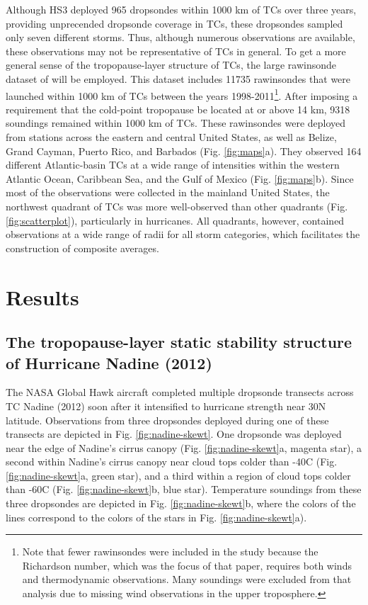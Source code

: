Although HS3 deployed 965 dropsondes within 1000 km of TCs over three years, providing unprecended dropsonde coverage in TCs, these dropsondes sampled only seven different storms.
Thus, although numerous observations are available, these observations may not be representative of TCs in general.
To get a more general sense of the tropopause-layer structure of TCs, the large rawinsonde dataset of \cite{DuranMolinari2016} will be employed.
This dataset includes 11735 rawinsondes that were launched within 1000 km of TCs between the years 1998-2011\footnote{Note that fewer rawinsondes were included in the \cite{DuranMolinari2016} study because the Richardson number, which was the focus of that paper, requires both winds and thermodynamic observations. Many soundings were excluded from that analysis due to missing wind observations in the upper troposphere.}.
After imposing a requirement that the cold-point tropopause be located at or above 14 km, 9318 soundings remained within 1000 km of TCs.
These rawinsondes were deployed from stations across the eastern and central United States, as well as Belize, Grand Cayman, Puerto Rico, and Barbados (Fig. \ref{fig:maps}a).
They observed 164 different Atlantic-basin TCs at a wide range of intensities within the western Atlantic Ocean, Caribbean Sea, and the Gulf of Mexico (Fig. \ref{fig:maps}b).
Since most of the observations were collected in the mainland United States, the northwest quadrant of TCs was more well-observed than other quadrants (Fig. \ref{fig:scatterplot}), particularly in hurricanes.
All quadrants, however, contained observations at a wide range of radii for all storm categories, which facilitates the construction of composite averages.

\section{Results}
\subsection{The tropopause-layer static stability structure of Hurricane Nadine (2012)}
The NASA Global Hawk aircraft completed multiple dropsonde transects across TC Nadine (2012) soon after it intensified to hurricane strength near 30\textdegree{}N latitude.
Observations from three dropsondes deployed during one of these transects are depicted in Fig. \ref{fig:nadine-skewt}.
One dropsonde was deployed near the edge of Nadine's cirrus canopy (Fig. \ref{fig:nadine-skewt}a, magenta star), a second within Nadine's cirrus canopy near cloud tops colder than -40\textdegree{}C (Fig. \ref{fig:nadine-skewt}a, green star), and a third within a region of cloud tops colder than -60\textdegree{}C (Fig. \ref{fig:nadine-skewt}b, blue star).
Temperature soundings from these three dropsondes are depicted in Fig. \ref{fig:nadine-skewt}b, where the colors of the lines correspond to the colors of the stars in Fig. \ref{fig:nadine-skewt}a).

